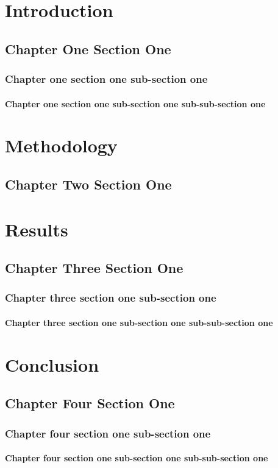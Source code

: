 \chapter{Introduction}
\section{Chapter One Section One}
\subsection{Chapter one section one sub-section one}

\subsubsection{Chapter one section one sub-section one sub-sub-section one}

\chapter{Methodology}
\section{Chapter Two Section One}


\chapter{Results}
\section{Chapter Three Section One}
\subsection{Chapter three section one sub-section one}
\subsubsection{Chapter three section one sub-section one sub-sub-section one}


\chapter{Conclusion}
\section{Chapter Four Section One}
\subsection{Chapter four section one sub-section one}
\subsubsection{Chapter four section one sub-section one sub-sub-section one}

